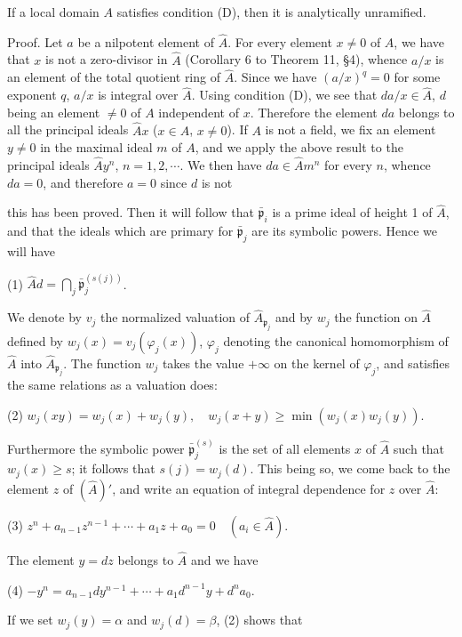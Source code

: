 If a local domain $A$ satisfies condition (D), then it is analytically unramified.

Proof. Let $a$ be a nilpotent element of $\hat{A}$. For every element $x \neq 0$ of $A$, we have that $x$ is not a zero-divisor in $\hat{A}$ (Corollary 6 to Theorem 11, §4), whence $a/x$ is an element of the total quotient ring of $\hat{A}$. Since we have $(a/x)^q = 0$ for some exponent $q$, $a/x$ is integral over $\hat{A}$. Using condition (D), we see that $da/x \in \hat{A}$, $d$ being an element $\neq 0$ of $A$ independent of $x$. Therefore the element $da$ belongs to all the principal ideals $\hat{A}x$ ($x \in A$, $x \neq 0$). If $A$ is not a field, we fix an element $y \neq 0$ in the maximal ideal $m$ of $A$, and we apply the above result to the principal ideals $\hat{A}y^n$, $n=1, 2, \cdots$. We then have $da \in \hat{A}m^n$ for every $n$, whence $da=0$, and therefore $a=0$ since $d$ is not

this has been proved. Then it will follow that $\bar{\mathfrak{p}}_i$ is a prime ideal of height 1 of $\hat{A}$, and that the ideals which are primary for $\bar{\mathfrak{p}}_j$ are its symbolic powers. Hence we will have

(1) $\hat{A}d = \bigcap_j \bar{\mathfrak{p}}_j^{(s(j))}$.

We denote by $v_j$ the normalized valuation of $\hat{A}_{\mathfrak{p}_j}$ and by $w_j$ the function on $\hat{A}$ defined by $w_j(x) = v_j(\varphi_j(x))$, $\varphi_j$ denoting the canonical homomorphism of $\hat{A}$ into $\hat{A}_{\mathfrak{p}_j}$. The function $w_j$ takes the value $+\infty$ on the kernel of $\varphi_j$, and satisfies the same relations as a valuation does:

(2) $w_j(xy) = w_j(x) + w_j(y), \quad w_j(x+y) \geq \min(w_j(x) w_j(y))$.

Furthermore the symbolic power $\bar{\mathfrak{p}}_j^{(s)}$ is the set of all elements $x$ of $\hat{A}$ such that $w_j(x) \geq s$; it follows that $s(j) = w_j(d)$. This being so, we come back to the element $z$ of $(\hat{A})'$, and write an equation of integral dependence for $z$ over $\hat{A}$:

(3) $z^n + a_{n-1}z^{n-1} + \cdots + a_1z + a_0 = 0 \quad (a_i \in \hat{A})$.

The element $y = dz$ belongs to $\hat{A}$ and we have

(4) $-y^n = a_{n-1}dy^{n-1} + \cdots + a_1d^{n-1}y + d^n a_0$.

If we set $w_j(y) = \alpha$ and $w_j(d) = \beta$, (2) shows that

